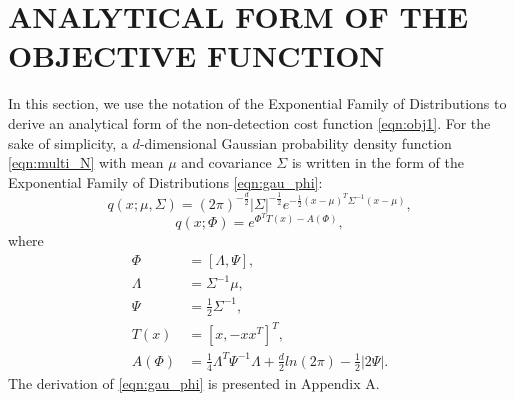 \documentclass[twocolumn,10pt]{asme2e}
\begin{document}
\section*{ANALYTICAL FORM OF THE OBJECTIVE FUNCTION}\label{sec:explicit_form}
In this section, we use the notation of the Exponential Family of Distributions to derive an analytical form of the non-detection cost function \cref{eqn:obj1}.
For the sake of simplicity, a $d$-dimensional Gaussian probability density function \cref{eqn:multi_N} with mean $\mu$ and covariance $\Sigma$ is written in the form of the Exponential Family of Distributions \cref{eqn:gau_phi}:
\begin{equation}\label{eqn:multi_N}
q(x;\mu,\Sigma)=(2\pi)^{-\frac{d}{2}}|\Sigma|^{-\frac{1}{2}}e^{-\frac{1}{2}(x-\mu)^T\Sigma^{-1}(x-\mu)},
\end{equation}
\begin{equation}\label{eqn:gau_phi}
q(x;\Phi)=e^{\Phi^TT(x)-A(\Phi)},
\end{equation}
where
\begin{subequations}\label{eqn:N2exp_para}
	\begin{align*}
	\Phi &= \left[\Lambda,\Psi\right],\\
	\Lambda&=\Sigma^{-1}\mu,\\
	\Psi&=\frac{1}{2}\Sigma^{-1},\\
	T(x)&=\left[ x,-xx^T\right]^T,\\
	A(\Phi)&=\frac{1}{4}\Lambda^T\Psi^{-1}\Lambda+\frac{d}{2}ln(2\pi)-\frac{1}{2}|2\Psi|.
	\end{align*}
\end{subequations}
The derivation of \cref{eqn:gau_phi} is presented in Appendix A.
\end{document}

